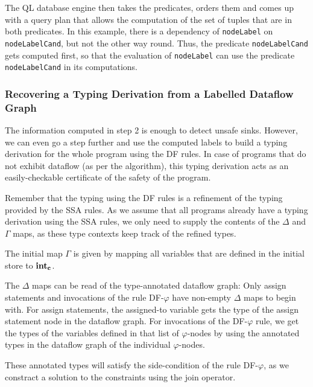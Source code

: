 The QL database engine then takes the predicates, orders them and comes up with 
a query plan that allows the computation of the set of tuples that are in both predicates.
In this example, there is a dependency of \texttt{nodeLabel} on \texttt{nodeLabelCand},
but not the other way round.
Thus, the predicate \texttt{nodeLabelCand} gets computed first, so that the evaluation
of \texttt{nodeLabel} can use the predicate \texttt{nodeLabelCand} in its computations.


\subsubsection*{Recovering a Typing Derivation from a Labelled Dataflow Graph}
The information computed in step 2 is enough to detect unsafe sinks.
However, we can even go a step further and use the computed labels to build a
typing derivation for the whole program using the DF rules.
In case of programs that do not exhibit dataflow (as per the algorithm), this
typing derivation acts as an easily-checkable certificate of the safety of the program.

Remember that the typing using the DF rules is a refinement of the typing provided 
by the SSA rules.
As we assume that all programs already have a typing derivation using the SSA rules,
we only need to supply the contents of the $\Delta$ and $\Gamma$ maps, as these 
type contexts keep track of the refined types.

The initial map $\Gamma$ is given by mapping all variables that are defined in 
the initial store to $\textbf{int}_\textbf{c}$.

The $\Delta$ maps can be read of the type-annotated dataflow graph:
Only assign statements and invocations of the rule \textsc{DF-$\varphi$}
have non-empty $\Delta$ maps to begin with.
For assign statements, the assigned-to variable gets the type of the assign statement 
node in the dataflow graph.
For invocations of the \textsc{DF-$\varphi$} rule, we get the types of the 
variables defined in that list of $\varphi$-nodes by using the annotated
types in the dataflow graph of the individual $\varphi$-nodes.

These annotated types will satisfy the side-condition of the rule \textsc{DF-$\varphi$},
as we constract a solution to the constraints using the join operator.

